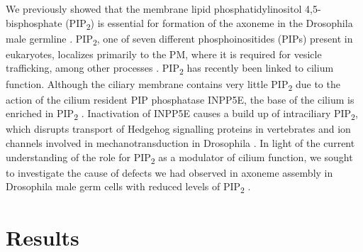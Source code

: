 \documentclass[12pt, twoside, letterpaper]{article}
\newcommand{\PIP}{PIP\textsubscript{2}}
\begin{document}
\begin{doublespacing}
\begin{linenumbers}
    We previously showed that the membrane lipid phosphatidylinositol 4,5-bisphosphate
    (\PIP{}) is essential for formation of the axoneme in the Drosophila
    male germline \citep{wei2008depletion, fabian2010phosphatidylinositol}.
    \PIP{}, one of seven different phosphoinositides (PIPs) present in eukaryotes,
    localizes primarily to the PM, where it is required for
    vesicle trafficking, among
    other processes \citep{balla2013phosphoinositides}.
    \PIP{} has recently been linked to cilium function.
    Although the ciliary membrane contains very little \PIP{} due to the action
    of the cilium resident PIP phosphatase INPP5E,
    the base of the cilium is enriched in \PIP{}
    \citep{nakatsu2015phosphoinositide}.
    Inactivation of INPP5E causes a build up of intraciliary \PIP{},
    which disrupts transport of Hedgehog signalling proteins in vertebrates
    \citep{chavez2015modulation, garcia2015phosphoinositides, conduit2017compartmentalized}
    and ion channels involved in mechanotransduction in Drosophila \citep{park2015ciliary}.
    In light of the current understanding of the role
    for \PIP{} as a modulator of cilium function,
    we sought to investigate the cause of defects we had observed
    in axoneme assembly in Drosophila male germ cells
    with reduced levels of \PIP{} \citep{wei2008depletion, fabian2010phosphatidylinositol}.

    \section*{Results}

\end{linenumbers}
\end{doublespacing}
\end{document}
